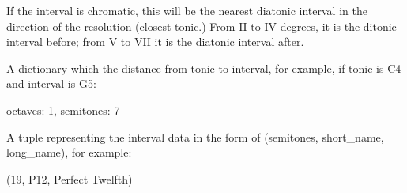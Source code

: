 \documentclass[letterpaper,10pt,english]{sphinxmanual}
\begin{document}
\begin{fulllineitems}
\begin{fulllineitems}
\end{fulllineitems}


\begin{fulllineitems}
\label{\detokenize{birdears:birdears.interval.Interval.diatonic_index}}
 \textendash{} If the interval is chromatic, this will be the
nearest diatonic interval in the direction of the resolution
(closest tonic.) From II to IV degrees, it is the ditonic interval
before; from V to VII it is the diatonic interval after.

\end{fulllineitems}


\begin{fulllineitems}
\label{\detokenize{birdears:birdears.interval.Interval.distance}}
 \textendash{} A dictionary which the distance from tonic to
interval, for example, if tonic is C4 and interval is G5:

%
\begin{sphinxVerbatim}[commandchars=\\\{\}]
\PYGZob{}
    \PYGZsq{}octaves\PYGZsq{}: 1,
    \PYGZsq{}semitones\PYGZsq{}: 7
\PYGZcb{}
\end{sphinxVerbatim}

\end{fulllineitems}


\begin{fulllineitems}
\label{\detokenize{birdears:birdears.interval.Interval.data}}
 \textendash{} A tuple representing the interval data in the form of
(semitones, short\_name, long\_name), for example:

%
\begin{sphinxVerbatim}[commandchars=\\\{\}]
(19, \PYGZsq{}P12\PYGZsq{}, \PYGZsq{}Perfect Twelfth\PYGZsq{})
\end{sphinxVerbatim}

\end{fulllineitems}


\end{fulllineitems}
\end{document}
